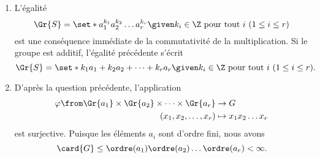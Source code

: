 \begin{enumerate}
  \item
    L'égalité
    \[
      \Gr{S} = \set*{ a_1^{k_1} a_2^{k_2}\dots a_r^{k_r} \given k_i\in\Z\text{ pour tout $i$ $(1\leq i\leq r)$}}
    \]
    est une conséquence immédiate de la commutativité de la multiplication.
    Si le groupe est additif, l'égalité précédente s'écrit
    \[
      \Gr{S} = \set*{ k_1a_1 + k_2a_2 + \dots + k_ra_r \given k_i\in\Z\text{ pour tout $i$ $(1\leq i\leq r)$}}.
    \]

  \item
    D'après la question précédente, l'application
    \begin{align*}
      \varphi \from \Gr{a_1}\times\Gr{a_2}\times\dots\times\Gr{a_r} &\to G \\
      (x_1,x_2,\dots,x_r) &\mapsto x_1x_2\dots x_r
    \end{align*}
    est surjective.
    Puisque les éléments $a_i$ sont d'ordre fini, nous avons
    \[
      \card{G}\leq \ordre(a_1)\ordre(a_2)\dots\ordre(a_r) < \infty.
    \]
\end{enumerate}
